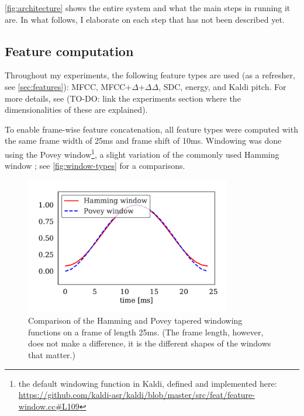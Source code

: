 \documentclass[bsc,frontabs,twoside,singlespacing,parskip,deptreport]{infthesis}
\begin{document}
{{    %

    \autoref{fig:architecture} shows the entire system and what the main steps in running it are. In what follows, I elaborate on each step that has not been described yet.

    \subsection{Feature computation}{
      \label{sec:feature-computation}
      Throughout my experiments, the following feature types are used (as a refresher, see \autoref{sec:features}): MFCC, MFCC+$\Delta$+$\Delta\Delta$, SDC, energy, and Kaldi pitch. For more details, see (TO-DO: link the experiments section where the dimensionalities of these are explained).

      To enable frame-wise feature concatenation, all feature types were computed with the same frame width of 25ms and frame shift of 10ms. Windowing was done using the Povey window\footnote{the default windowing function in Kaldi, defined and implemented here: \url{https://github.com/kaldi-asr/kaldi/blob/master/src/feat/feature-window.cc\#L109}}, a slight variation of the commonly used Hamming window \citep[p. 200]{Blackman_Tukey_1958}; see \autoref{fig:window-types} for a comparisons.
      \begin{figure}[h!]
        \centering
        \includegraphics[width=9cm]{../img/window-types.pdf}
        \vspace*{-1em}
        \caption{Comparison of the Hamming and Povey tapered windowing functions on a frame of length 25ms. (The frame length, however, does not make a difference, it is the different shapes of the windows that matter.)}
        \label{fig:window-types}
      \end{figure}

}}}
\end{document}
